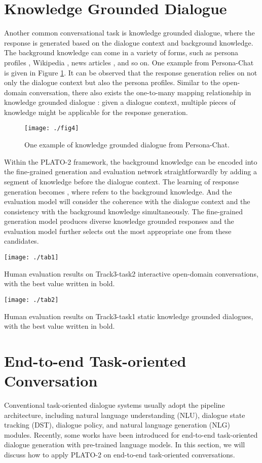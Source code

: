 \documentclass[letterpaper]{article} \usepackage{aaai21}  \usepackage{times}  \usepackage{helvet} \usepackage{courier}  \usepackage[hyphens]{url}  \usepackage{graphicx} \urlstyle{rm} \def\UrlFont{\rm}  \usepackage{natbib}  \usepackage{caption} \frenchspacing  \setlength{\pdfpagewidth}{8.5in}  \setlength{\pdfpageheight}{11in}  \usepackage{amsmath}
\begin{document}
\section{Knowledge Grounded Dialogue}
Another common conversational task is knowledge grounded dialogue, where the response is generated based on the dialogue context and background knowledge. The background knowledge can come in a variety of forms, such as persona profiles \cite{zhang2018personalizing}, Wikipedia \cite{dinan2018wizard}, news articles \cite{gopalakrishnan2019topical}, and so on. One example from Persona-Chat is given in Figure \ref{fig:persona}. It can be observed that the response generation relies on not only the dialogue context but also the persona profiles. Similar to the open-domain conversation, there also exists the one-to-many mapping relationship in knowledge grounded dialogue \cite{kim2019sequential}: given a dialogue context, multiple pieces of knowledge might be applicable for the response generation. 
\begin{figure}
	\centering
	\texttt{[image: ./fig4]}
	\caption{One example of knowledge grounded dialogue from Persona-Chat.}
	\label{fig:persona}
\end{figure} 

Within the PLATO-2 framework, the background knowledge can be encoded into the fine-grained generation and evaluation network straightforwardly by adding a segment of knowledge before the dialogue context. The learning of response generation becomes , where  refers to the background knowledge. And the evaluation model  will consider the coherence with the dialogue context and the consistency with the background knowledge simultaneously. The fine-grained generation model produces diverse knowledge grounded responses and the evaluation model further selects out the most appropriate one from these candidates. 

\begin{table*}
	\centering
	\texttt{[image: ./tab1]}
	\caption{Human evaluation results on Track3-task2 interactive open-domain conversations, with the best value written in bold.}
	\label{tab:chat}
\end{table*} 
\begin{table*}
	\centering
	\texttt{[image: ./tab2]}
	\caption{Human evaluation results on Track3-task1 static knowledge grounded dialogues, with the best value written in bold.}
	\label{tab:knowledge}
\end{table*} 
\section{End-to-end Task-oriented Conversation}
Conventional task-oriented dialogue systems usually adopt the pipeline architecture, including natural language understanding (NLU), dialogue state tracking (DST), dialogue policy, and natural language generation (NLG) modules. Recently, some works \cite{ham2020end, peng2020soloist} have been introduced for end-to-end task-oriented dialogue generation with pre-trained language models. In this section, we will discuss how to apply PLATO-2 on end-to-end task-oriented conversations. 
\end{document}
